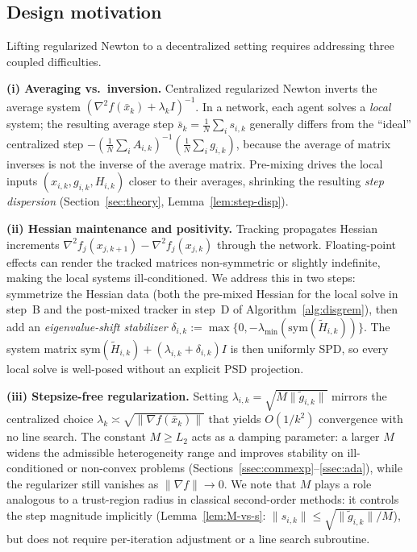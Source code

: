\documentclass[11pt,a4paper]{article}
\def\cO{O}%
\newcommand{\cO}{\mathcal{O}}
\begin{document}
	\subsection{Design motivation}\label{ssec:design}
	
	Lifting regularized Newton to a decentralized setting requires
	addressing three coupled difficulties.
	
	\textbf{(i) Averaging vs.\ inversion.}
	Centralized regularized Newton inverts the average system
	$(\nabla^2 f(\bar x_k)+\lambda_k I)^{-1}$.
	In a network, each agent solves a \emph{local} system; the
	resulting average step
	$\bar s_k=\frac1N\sum_i s_{i,k}$ generally differs from the
	``ideal'' centralized step
	$-(\frac1N\sum_i A_{i,k})^{-1}(\frac1N\sum_i g_{i,k})$,
	because the average of matrix inverses is not the inverse of
	the average matrix.
	Pre-mixing drives the local inputs
	$(x_{i,k},g_{i,k},H_{i,k})$ closer to their averages,
	shrinking the resulting \emph{step dispersion}
	(Section~\ref{sec:theory}, Lemma~\ref{lem:step-disp}).
	
	\textbf{(ii) Hessian maintenance and positivity.}
	Tracking propagates Hessian increments
	$\nabla^2 f_j(x_{j,k+1})-\nabla^2 f_j(x_{j,k})$ through the
	network.
	Floating-point effects can render the tracked matrices
	non-symmetric or slightly indefinite, making the local systems
	ill-conditioned.
	We address this in two steps: symmetrize the Hessian data
	(both the pre-mixed Hessian for the local solve in step~B
	and the post-mixed tracker in step~D of Algorithm~\ref{alg:disgrem}),
	then add an \emph{eigenvalue-shift stabilizer}
	$\delta_{i,k}:=\max\{0,-\lambda_{\min}(\mathrm{sym}(\tilde H_{i,k}))\}$.
	The system matrix
	$\mathrm{sym}(\tilde H_{i,k})+(\lambda_{i,k}+\delta_{i,k})I$
	is then uniformly SPD, so every local solve is well-posed
	without an explicit PSD projection.
	
	\textbf{(iii) Stepsize-free regularization.}
	Setting $\lambda_{i,k}=\sqrt{M\|\tilde g_{i,k}\|}$ mirrors
	the centralized choice
	$\lambda_k\asymp\sqrt{\|\nabla f(\bar x_k)\|}$ that yields
	$\cO(1/k^2)$ convergence with no line search.
	The constant $M\ge L_2$ acts as a damping parameter: a larger $M$
	widens the admissible heterogeneity range and improves
	stability on ill-conditioned or non-convex problems
	(Sections~\ref{ssec:commexp}--\ref{ssec:ada}), while the
	regularizer still vanishes as $\|\nabla f\|\to 0$.
	We note that $M$ plays a role analogous to a trust-region radius
	in classical second-order methods: it controls the step magnitude
	implicitly (Lemma~\ref{lem:M-vs-s}: $\|s_{i,k}\|\le\sqrt{\|\tilde g_{i,k}\|/M}$),
	but does not require per-iteration adjustment or a line search subroutine.
	
\end{document}
